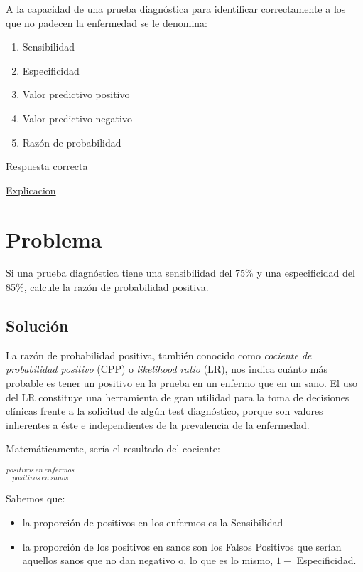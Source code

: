 \documentclass[
]{book}
\providecommand{\tightlist}{%
  \setlength{\itemsep}{0pt}\setlength{\parskip}{0pt}}
\begin{document}
A la capacidad de una prueba diagnóstica para identificar correctamente a los que no padecen la enfermedad se le denomina:

\begin{enumerate}
\def\labelenumi{\alph{enumi})}
\tightlist
\item
  Sensibilidad
\item
  Especificidad
\item
  Valor predictivo positivo
\item
  Valor predictivo negativo
\item
  Razón de probabilidad
\end{enumerate}

Respuesta correcta

\href{https://1fjmanzano.github.io/bioestadistica/relaci\%C3\%B3n-entre-variables-cualitativas.html\#diagno\%CC\%81stico-cli\%CC\%81nico}{Explicacion}

\hypertarget{problema-9}{%
\section{Problema}\label{problema-9}}

Si una prueba diagnóstica tiene una sensibilidad del 75\% y una especificidad del 85\%, calcule la razón de probabilidad positiva.

\hypertarget{soluciuxf3n-7}{%
\subsection{Solución}\label{soluciuxf3n-7}}

La razón de probabilidad positiva, también conocido como \emph{cociente de probabilidad positivo} (CPP) o \emph{likelihood ratio} (LR), nos indica cuánto más probable es tener un positivo en la prueba en un enfermo que en un sano. El uso del LR constituye una herramienta de gran utilidad para la toma de decisiones clínicas frente a la solicitud de algún test diagnóstico, porque son valores inherentes a éste e independientes de la prevalencia de la enfermedad.

Matemáticamente, sería el resultado del cociente:

\(\frac{positivos ~ en ~ enfermos}{positivos ~ en ~ sanos}\)

Sabemos que:

\begin{itemize}
\tightlist
\item
  la proporción de positivos en los enfermos es la Sensibilidad
\item
  la proporción de los positivos en sanos son los Falsos Positivos que serían aquellos sanos que no dan negativo o, lo que es lo mismo, \(1 -\) Especificidad.
\end{itemize}
\end{document}
